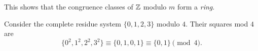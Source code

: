 \begin{remark}
  This shows that the congruence classes
  of $\mathbb{Z}$ modulo $m$ form a \emph{ring}.
\end{remark}

\begin{example}
  Consider the complete residue system
  $\{0, 1, 2, 3\}$ modulo $4$. Their
  squares mod $4$ are
  \[
    \{0^2, 1^2, 2^2, 3^2\}
    \equiv \{0, 1, 0, 1\}
    \equiv \{0, 1\} \pmod{4}.
  \]
\end{example}
